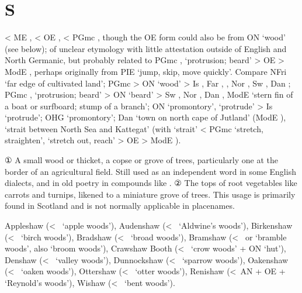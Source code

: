 \documentclass[12pt,letterpaper,oneside,article,draft]{memoir}
\begin{document}
\section*{S}

\begin{Lemma}
\begin{Etymology}
	< ME ,  < OE ,  < PGmc , though
		the OE  form could also be from ON  ‘wood’ (see below);
		of unclear etymology with little attestation outside of English and North Germanic,
		but probably related to PGmc ,  ‘protrusion; beard’ >
		OE  > ModE , perhaps originally from PIE 
		‘jump, skip, move quickly’.
	Compare
	NFri  ‘far edge of cultivated land’;
	PGmc  > ON  ‘wood’ > Is , Far , ,
		Nor , Sw , Dan ;
	PGmc ,  ‘protrusion; beard’ > ON  ‘beard’ >
			Sw , Nor , Dan ,
			ModE  ‘stern fin of a boat or surfboard; stump of a branch’;
	ON  ‘promontory’,  ‘protrude’ > Is  ‘protrude’;
	OHG  ‘promontory’;
	Dan  ‘town on north cape of Jutland’ (ModE ),
		 ‘strait between North Sea and Kattegat’
		(with  ‘strait’ < PGmc  ‘stretch, straighten’,
		 ‘stretch out, reach’ > OE  > ModE ).
\end{Etymology}
\begin{Definitions}
	① A small wood or thicket, a copse or grove of trees, particularly one at the border of an agricultural field.
		Still used as an independent word in some English dialects, and in old poetry in
		compounds like .
	② The tops of root vegetables like carrots and turnips, likened to a miniature grove of trees.
		This usage is primarily found in Scotland and is not normally applicable in placenames.
\end{Definitions}
\begin{Examples}
	Appleshaw (<~ ‘apple woods’),
	Audenshaw (<~ ‘Aldwine’s woods’),
	Birkenshaw (<~ ‘birch woods’),
	Bradshaw (<~ ‘broad woods’),
	Bramshaw (<~ or  ‘bramble woods’, also  ‘broom woods’),
	Crawshaw Booth (<~ ‘crow woods’ + ON  ‘hut’),
	Denshaw (<~ ‘valley woods’),
	Dunnockshaw (<~ ‘sparrow woods’),
	Oakenshaw (<~ ‘oaken woods’),
	Ottershaw (<~ ‘otter woods’),
	Renishaw (<~AN  + OE   +  ‘Reynold’s woods’),
	Wishaw (<~ ‘bent woods’).
\end{Examples}
\end{Lemma}
\end{document}
